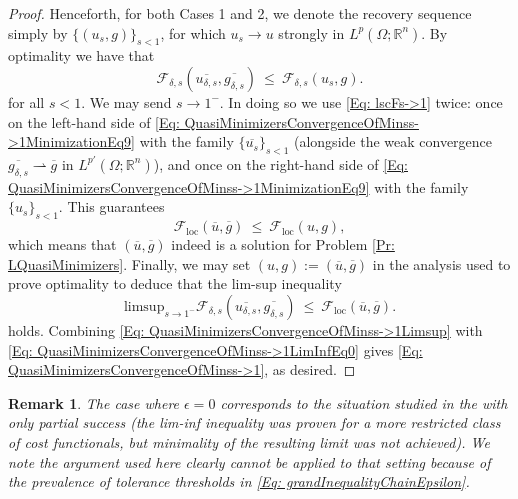 \documentclass[11pt, reqno]{amsart}   	%
\theoremstyle{plain}
\numberwithin{equation}{section}
\newtheorem{remark}[thm]{Remark}
\def\de{\delta}
\def\ep{\epsilon}
\def\Om{\Omega}
\def\R{\mathbb{R}}
\def\limsup{\text{limsup}}
\def\loc{\text{loc}}
\begin{document}
\begin{proof}
Henceforth, for both Cases 1 and 2, we denote the recovery sequence simply by $\{(u_s, g)\}_{s < 1}$, for which $u_s \rightarrow u$ strongly in $L^p(\Om; \R^n)$.
By optimality we have that
\begin{equation}\label{Eq: QuasiMinimizersConvergenceOfMinss->1MinimizationEq9}
    \mathcal{F}_{\de, s}(\overline{u_{\de, s}}, \overline{g_{\de, s}}) \ \leq \ \mathcal{F}_{\de, s}(u_s, g).
    \end{equation}
    for all $s < 1$. We may send $s \rightarrow 1^-$. In doing so we use \eqref{Eq: lscFs->1} twice: once on the left-hand side of \eqref{Eq: QuasiMinimizersConvergenceOfMinss->1MinimizationEq9} with the family $\{\overline{u_s}\}_{s < 1}$ (alongside the weak convergence $\overline{g_{\de, s}} \rightharpoonup \overline{g}$ in $L^{p'}(\Om; \R^n)$), and once on the right-hand side of \eqref{Eq: QuasiMinimizersConvergenceOfMinss->1MinimizationEq9} with the family $\{u_s\}_{s < 1}$. This guarantees
    \begin{equation}\label{Eq: QuasiMinimizersConvergenceOfMinss->1MinimizationEq10}
        \mathcal{F}_{\loc}(\overline{u}, \overline{g}) \ \leq \ \mathcal{F}_{\loc}(u, g),
    \end{equation}
    which means that $(\overline{u}, \overline{g})$ indeed is a solution for Problem \ref{Pr: LQuasiMinimizers}. Finally, we may set $(u, g) := (\overline{u}, \overline{g})$ in the analysis used to prove optimality to deduce that the lim-sup inequality
    \begin{equation}\label{Eq: QuasiMinimizersConvergenceOfMinss->1Limsup}
        \limsup_{s \rightarrow 1^-}\mathcal{F}_{\de, s}(\overline{u_{\de, s}}, \overline{g_{\de, s}}) \ \leq \  \mathcal{F}_{\loc}(\overline{u}, \overline{g}).
    \end{equation}
    holds. Combining \eqref{Eq: QuasiMinimizersConvergenceOfMinss->1Limsup} with \eqref{Eq: QuasiMinimizersConvergenceOfMinss->1LimInfEq0} gives \eqref{Eq: QuasiMinimizersConvergenceOfMinss->1}, as desired.
 \end{proof}

 \begin{remark}\label{Rmk: Ep=0}
     The case where $\ep = 0$ corresponds to the situation studied in the \cite{cueto2026localization} with only partial success (the lim-inf inequality was proven for a more restricted class of cost functionals, but minimality of the resulting limit was not achieved). We note the argument used here clearly cannot be applied to that setting because of the prevalence of tolerance thresholds in \eqref{Eq: grandInequalityChainEpsilon}.
 \end{remark}
\end{document}
